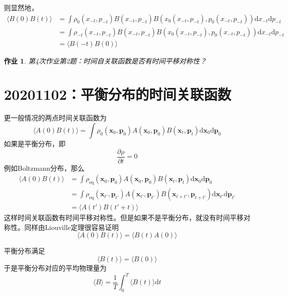 \documentclass[12pt]{article}
\newtheorem{asg}{作业}
\begin{document}
    则显然地，
    \begin{equation}\begin{aligned}
        \langle B(0)B(t) \rangle &= \int \rho_0(x_{-t},p_{-t}) B(x_{-t},p_{-t}) B(x_0(x_{-t},p_{-t}),p_0(x_{-t},p_{-t})) \mathrm{d}x_{-t} \mathrm{d}p_{-t}\\
        &= \int \rho_{-t}(x_{-t},p_{-t}) B(x_{-t},p_{-t}) B(x_0(x_{-t},p_{-t}),p_0(x_{-t},p_{-t})) \mathrm{d}x_{-t} \mathrm{d}p_{-t}\\
        &= \langle B(-t)B(0) \rangle
    \end{aligned}\end{equation}
    \begin{asg}
        第4次作业第2题：时间自关联函数是否有时间平移对称性？
    \end{asg}

\section{20201102：平衡分布的时间关联函数}
    更一般情况的两点时间关联函数为
    \begin{equation}
    \langle A(0)B(t) \rangle = \int \rho_0(\bm{x}_0,\bm{p}_0) A(\bm{x}_0,\bm{p}_0) B(\bm{x}_t,\bm{p}_t) \mathrm{d}\bm{x}_0 \mathrm{d}\bm{p}_0
    \end{equation}
    如果是平衡分布，即
    \begin{equation}
        \frac {\partial \rho}{\partial t} = 0
    \end{equation}
    例如Boltzmann分布，那么
    \begin{equation}\begin{aligned}
        \langle A(0)B(t) \rangle &= \int \rho_\mathrm{eq}(\bm{x}_0,\bm{p}_0) A(\bm{x}_0,\bm{p}_0) B(\bm{x}_t,\bm{p}_t) \mathrm{d}\bm{x}_0 \mathrm{d}\bm{p}_0\\
        &= \int \rho_\mathrm{eq}(\bm{x}_{t'},\bm{p}_{t'}) A(\bm{x}_{t'},\bm{p}_{t'}) B(\bm{x}_{t+t'},\bm{p}_{t+t'}) \mathrm{d}\bm{x}_{t'} \mathrm{d}\bm{p}_{t'}\\
        &= \langle A(t')B(t'+ t) \rangle
    \end{aligned}\end{equation}
    这样时间关联函数有时间平移对称性。但是如果不是平衡分布，就没有时间平移对称性。同样由Liouville定理很容易证明
    \begin{equation}
        \langle A(0)B(t) \rangle = \langle B(t)A(0) \rangle
    \end{equation}

    平衡分布满足
    \begin{equation}
    \langle B(t) \rangle = \langle B(0) \rangle
    \end{equation}
    于是平衡分布对应的平均物理量为
    \begin{equation}
    \langle B \rangle = \frac 1T \int_0^T \langle B(t) \rangle \mathrm{d}t
    \end{equation}
\end{document}
